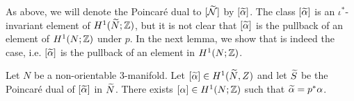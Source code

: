 As above, we will denote the Poincar\'e dual to $[\widetilde{\mathcal{N}}]$ by $[\widetilde{\alpha}]$.  The class $[\widetilde{\alpha}]$ is an $\iota^{\ast}$-invariant element of $H^1(\widetilde{N}; \mathbb{Z})$, but it is not clear that $[\widetilde{\alpha}]$ is the pullback of an element of $H^1(N; \mathbb{Z})$ under $p$.
In the next lemma, we show that is indeed the case, i.e. $[\widetilde{\alpha}]$ is the pullback of an element in $H^1(N; \mathbb{Z})$.
\begin{lem}
  \label{lem:PD2}
Let $N$ be a non-orientable 3-manifold.  Let $[\widetilde{\alpha}]\in H^1(\widetilde{N}, Z)$ and let $\widetilde{S}$ be the Poincar\'e dual of $[\widetilde{\alpha}]$ in $\widetilde{N}$.  There exists $[\alpha] \in H^1(N; \mathbb{Z})$ such that $\widetilde{\alpha} = p^{\ast} \alpha$.
\end{lem}
